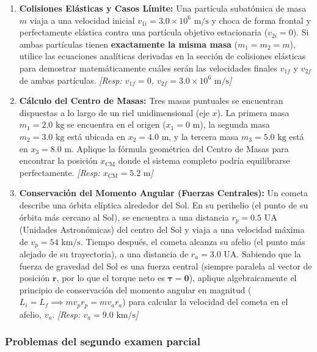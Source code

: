 \documentclass[11pt,a4paper]{book}
\begin{document}
\begin{enumerate}
    \item \textbf{Colisiones Elásticas y Casos Límite:} Una partícula subatómica de masa $m$ viaja a una velocidad inicial $v_{1i} = 3.0 \times 10^6 \text{ m/s}$ y choca de forma frontal y perfectamente elástica contra una partícula objetivo estacionaria ($v_{2i} = 0$). Si ambas partículas tienen \textbf{exactamente la misma masa} ($m_1 = m_2 = m$), utilice las ecuaciones analíticas derivadas en la sección de colisiones elásticas para demostrar matemáticamente cuáles serán las velocidades finales $v_{1f}$ y $v_{2f}$ de ambas partículas. \textit{[Resp: $v_{1f} = 0$, $v_{2f} = 3.0 \times 10^6 \text{ m/s}$]}

    \item \textbf{Cálculo del Centro de Masas:} Tres masas puntuales se encuentran dispuestas a lo largo de un riel unidimensional (eje $x$). La primera masa $m_1 = 2.0 \text{ kg}$ se encuentra en el origen ($x_1 = 0 \text{ m}$), la segunda masa $m_2 = 3.0 \text{ kg}$ está ubicada en $x_2 = 4.0 \text{ m}$, y la tercera masa $m_3 = 5.0 \text{ kg}$ está en $x_3 = 8.0 \text{ m}$. Aplique la fórmula geométrica del Centro de Masas para encontrar la posición $x_{\text{CM}}$ donde el sistema completo podría equilibrarse perfectamente. \textit{[Resp: $x_{\text{CM}} = 5.2 \text{ m}$]}

    \item \textbf{Conservación del Momento Angular (Fuerzas Centrales):} Un cometa describe una órbita elíptica alrededor del Sol. En su perihelio (el punto de su órbita más cercano al Sol), se encuentra a una distancia $r_p = 0.5 \text{ UA}$ (Unidades Astronómicas) del centro del Sol y viaja a una velocidad máxima de $v_p = 54 \text{ km/s}$. Tiempo después, el cometa alcanza su afelio (el punto más alejado de su trayectoria), a una distancia de $r_a = 3.0 \text{ UA}$. Sabiendo que la fuerza de gravedad del Sol es una fuerza central (siempre paralela al vector de posición $\boldsymbol{r}$, por lo que el torque neto es $\boldsymbol{\tau} = \boldsymbol{0}$), aplique algebraicamente el principio de conservación del momento angular en magnitud ($L_i = L_f \implies m v_p r_p = m v_a r_a$) para calcular la velocidad del cometa en el afelio, $v_a$. \textit{[Resp: $v_a = 9.0 \text{ km/s}$]}
\end{enumerate}

\subsubsection{Problemas del segundo examen parcial}
\label{sec:problemas-parcial2}
\end{document}
